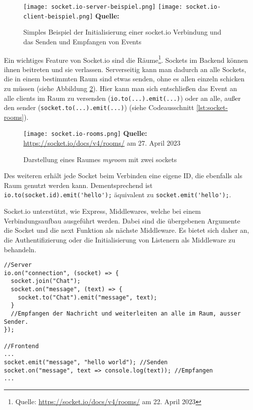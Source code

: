   \begin{figure}[ht]
\raggedleft
  \texttt{[image: socket.io-server-beispiel.png]}
  \texttt{[image: socket.io-client-beispiel.png]}
    \footnotesize\sffamily\textbf{Quelle:} \cite{socketio}
  \caption{Simples Beispiel der Initialisierung einer socket.io Verbindung und das Senden und Empfangen von Events}
  \label{fig:socket.io-beispiel}
\end{figure}

Ein wichtiges Feature von Socket.io sind die Räume\footnote{Quelle: \url{https://socket.io/docs/v4/rooms/} am 22. April 2023}. Sockets im Backend können ihnen beitreten und sie verlassen. Serverseitig kann man dadurch an alle Sockets, die in einem bestimmten Raum sind etwas senden, ohne es allen einzeln schicken zu müssen (siehe Abbildung \ref{fig:socket.io-room}). Hier kann man sich entschließen das Event an alle clients im Raum zu versenden (\verb|io.to(...).emit(...)|) oder an alle, außer den sender (\verb|socket.to(...).emit(...)|) (siehe Codeausschnitt \ref{lst:socket-rooms}).


  \begin{figure}[ht]
  \centering
  \texttt{[image: socket.io-rooms.png]}
\raggedleft
    \footnotesize\sffamily\textbf{Quelle:} \url{https://socket.io/docs/v4/rooms/} am 27. April 2023
  \caption{Darstellung eines Raumes \textit{myroom} mit zwei sockets}
  \label{fig:socket.io-room}
\end{figure}

Des weiteren erhält jede Socket beim Verbinden eine eigene ID, die ebenfalls als Raum genutzt werden kann. Dementsprechend ist \verb|io.to(socket.id).emit('hello');| äquivalent zu \verb|socket.emit('hello');|.

Socket.io unterstützt, wie Express, Middlewares, welche bei einem Verbindungsaufbau ausgeführt werden. Dabei sind die übergebenen Argumente die Socket und die next Funktion als nächste Middleware.
Es bietet sich daher an, die Authentifizierung oder die Initialisierung von Listenern als Middleware  zu behandeln.


\begin{lstlisting}[style=codeStyle, caption={Beispiel zum Beitreten Raums und das senden eines Events in diesen Raum}, label={lst:socket-rooms}]
//Server
io.on("connection", (socket) => {
  socket.join("Chat");
  socket.on("message", (text) => {
  	socket.to("Chat").emit("message", text);
  }
  //Empfangen der Nachricht und weiterleiten an alle im Raum, ausser Sender.
});

//Frontend
...
socket.emit("message", "hello world"); //Senden
socket.on("message", text => console.log(text)); //Empfangen
...
\end{lstlisting}

